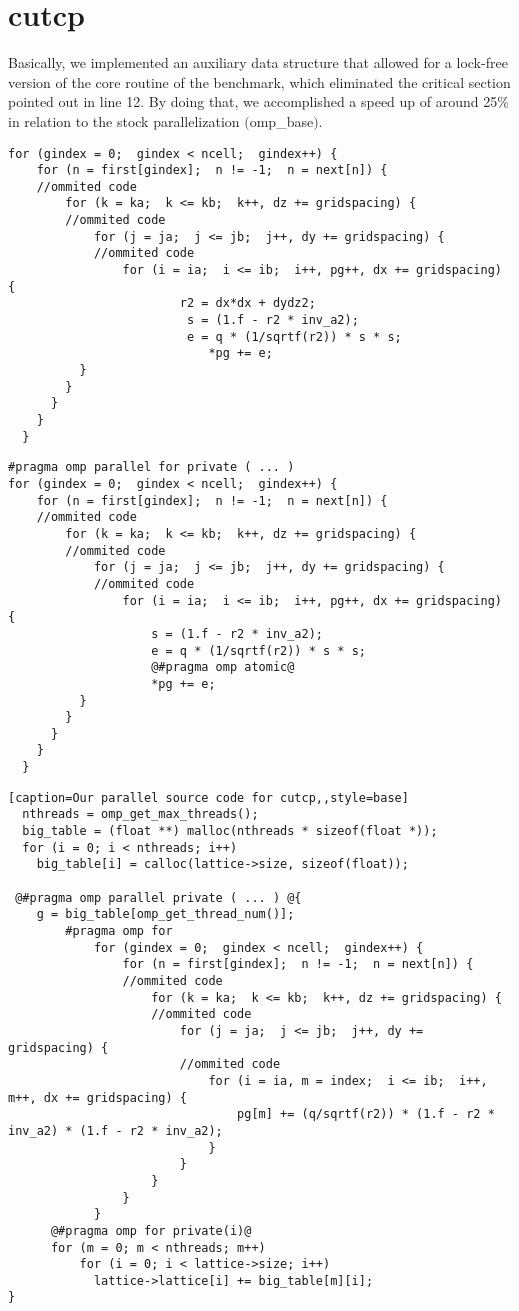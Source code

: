 \documentclass[10pt,a4paper]{report}
\begin{document}
\section{cutcp}
Basically, we implemented an auxiliary data structure that allowed for a lock-free version of the core routine of the benchmark, which eliminated the critical section pointed out in line 12. By doing that, we accomplished a speed up of around 25\% in relation to the stock parallelization \((\)omp\_base\()\).

\begin{lstlisting}[caption=cutcp serial version source,style=base]
for (gindex = 0;  gindex < ncell;  gindex++) {
    for (n = first[gindex];  n != -1;  n = next[n]) {
    //ommited code
    	for (k = ka;  k <= kb;  k++, dz += gridspacing) {
    	//ommited code
    		for (j = ja;  j <= jb;  j++, dy += gridspacing) {
    		//ommited code
    			for (i = ia;  i <= ib;  i++, pg++, dx += gridspacing) {
    					r2 = dx*dx + dydz2;
   						 s = (1.f - r2 * inv_a2);
   						 e = q * (1/sqrtf(r2)) * s * s;
							*pg += e;
          }
        }
      }
    }
  }
\end{lstlisting}


\begin{lstlisting}[caption=Original parallel cutcp source code,style=base]
#pragma omp parallel for private ( ... )
for (gindex = 0;  gindex < ncell;  gindex++) {
    for (n = first[gindex];  n != -1;  n = next[n]) {
    //ommited code
    	for (k = ka;  k <= kb;  k++, dz += gridspacing) {
    	//ommited code
    		for (j = ja;  j <= jb;  j++, dy += gridspacing) {
    		//ommited code
    			for (i = ia;  i <= ib;  i++, pg++, dx += gridspacing) {
					s = (1.f - r2 * inv_a2);
					e = q * (1/sqrtf(r2)) * s * s;
					@#pragma omp atomic@
					*pg += e;
          }
        }
      }
    }
  }
\end{lstlisting}


\begin{lstlisting}[caption=Our parallel source code for cutcp,,style=base]
  nthreads = omp_get_max_threads();  
  big_table = (float **) malloc(nthreads * sizeof(float *));
  for (i = 0; i < nthreads; i++)
  	big_table[i] = calloc(lattice->size, sizeof(float));
  	
 @#pragma omp parallel private ( ... ) @{
	g = big_table[omp_get_thread_num()];
		#pragma omp for
			for (gindex = 0;  gindex < ncell;  gindex++) {
				for (n = first[gindex];  n != -1;  n = next[n]) {
				//ommited code
					for (k = ka;  k <= kb;  k++, dz += gridspacing) {
					//ommited code
						for (j = ja;  j <= jb;  j++, dy += gridspacing) {
						//ommited code
							for (i = ia, m = index;  i <= ib;  i++, m++, dx += gridspacing) {
								pg[m] += (q/sqrtf(r2)) * (1.f - r2 * inv_a2) * (1.f - r2 * inv_a2);
							}
						}
					}
				}
			}	  
	  @#pragma omp for private(i)@
	  for (m = 0; m < nthreads; m++)
		  for (i = 0; i < lattice->size; i++)
		  	lattice->lattice[i] += big_table[m][i];
} 	
\end{lstlisting}
\end{document}
